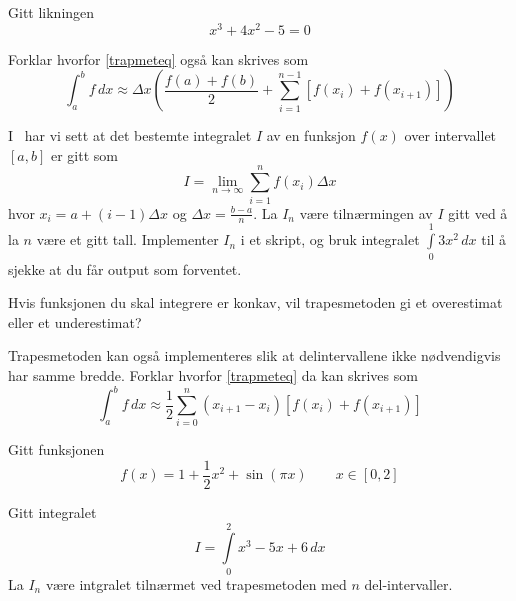 






\opgt
\nes
{}
Gitt likningen
\[ x^3+4x^2-5=0 \]

\nes

Forklar hvorfor \eqref{trapmeteq} også kan skrives som
\[ \int_{a}^{b} f\,dx \approx \Delta x\left(\frac{f(a)+f(b)}{2}+\sum_{i=1}^{n-1}\left[f(x_i)+f(x_{i+1})\right]\right)  \]

I \tmto\ har vi sett at det bestemte integralet $ I $ av en funksjon $ f(x) $ over intervallet $ [a, b] $ er gitt som
\begin{equation}
	I= \lim\limits_{n\to \infty}\sum\limits_{i=1}^{n} f(x_{i})\Delta x 
\end{equation}
hvor $ {x_i=a+(i-1)\Delta x}$ og $ {\Delta x=\frac{b-a}{n}} $. La $ I_n $ være tilnærmingen av $ I $ gitt ved å la $ n $ være et gitt tall. Implementer $ I_n $ i et skript, og bruk integralet $ \int\limits_{0}^1 3x^2\,dx $ til å sjekke at du får output som forventet.

Hvis funksjonen du skal integrere er konkav, vil trapesmetoden gi et overestimat eller et underestimat?

\newpage
{}
Trapesmetoden kan også implementeres slik at delintervallene ikke nødvendigvis har samme bredde. Forklar hvorfor \eqref{trapmeteq} da kan skrives som
\[ \int_{a}^{b} f\,dx \approx \frac{1}{2}\sum_{i=0}^{n} (x_{i+1}-x_i)\left[f(x_i)+f(x_{i+1})\right]  \]

Gitt funksjonen 
\[ f(x)= 1+\frac{1}{2}x^2+\sin(\pi x) \qquad x\in [0, 2]\]

Gitt integralet
\[ I=\int\limits_0^2 x^3-5x+6\,dx\]
La $ I_n $ være intgralet tilnærmet ved trapesmetoden med $ n $ del-intervaller.
